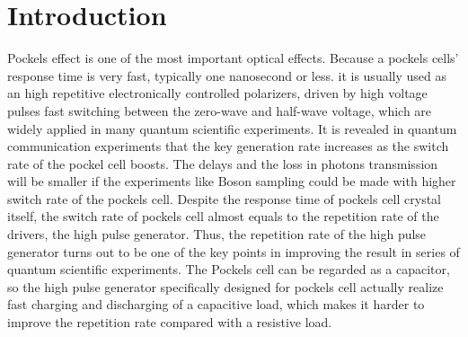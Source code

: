 \documentclass[aip,rsi,reprint,graphicx]{revtex4-1} %
\begin{document}
\pacs{}%

\maketitle %


\section{Introduction}
Pockels effect is one of the most important optical effects. Because a pockels cells' response time is very fast, typically one nanosecond or less. it is usually used as an high repetitive electronically controlled polarizers, driven by high voltage pulses fast switching between the zero-wave and half-wave voltage, which are widely applied in many quantum scientific experiments\cite{yin2017satellite}.
It is revealed in quantum communication experiments that the key generation rate increases as the switch rate of the pockel cell boosts\cite{li2016experimental}. The delays and the loss in photons transmission will be smaller if the experiments like Boson sampling\cite{wang2017high} could be made with higher switch rate of the pockels cell.
Despite the response time of pockels cell crystal itself, the switch rate of pockels cell almost equals to the repetition rate of the drivers, the high pulse generator.
Thus, the repetition rate of the high pulse generator turns out to be one of the key points in improving the result in series of quantum scientific experiments.
The Pockels cell can be regarded as a capacitor, so the high pulse generator specifically designed for pockels cell actually realize fast charging and discharging of a capacitive load, which makes it harder to improve the repetition rate compared with a resistive load.
\end{document}
